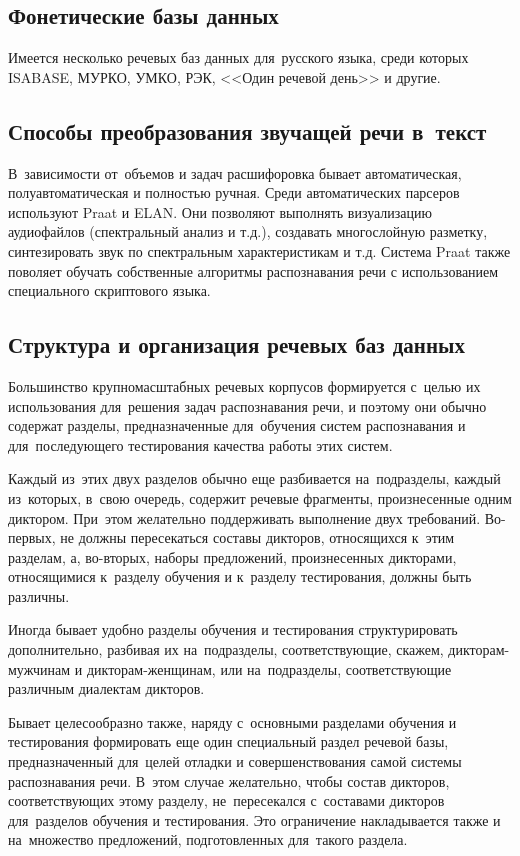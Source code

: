 \documentclass[12pt]{article}
\theoremstyle{definition}
\theoremstyle{remark}
\numberwithin{equation}{section}
\begin{document}
\subsection{Фонетические базы данных}
Имеется несколько речевых баз данных для~русского языка, среди которых
ISABASE, МУРКО, УМКО, РЭК, <<Один речевой день>> и другие.

\subsection{Способы преобразования звучащей речи в~текст}
В~зависимости от~объемов и задач расшифоровка бывает автоматическая,
полуавтоматическая и полностью ручная. Среди автоматических парсеров
используют Praat и ELAN. Они позволяют выполнять визуализацию аудиофайлов (спектральный анализ и т.д.), создавать многослойную разметку, синтезировать звук по спектральным характеристикам и т.д. Система Praat также поволяет обучать собственные алгоритмы распознавания речи с использованием специального скриптового языка.

\subsection{Структура и организация речевых баз данных}
Большинство крупномасштабных речевых корпусов формируется с~целью их
использования для~решения задач распознавания речи, и поэтому они обычно
содержат разделы, предназначенные для~обучения систем распознавания и
для~последующего тестирования качества работы этих систем.

Каждый из~этих двух разделов обычно еще разбивается на~подразделы, каждый
из~которых, в~свою очередь, содержит речевые фрагменты, произнесенные
одним диктором. При~этом желательно поддерживать выполнение двух требований.
Во-первых, не должны пересекаться составы дикторов, относящихся к~этим
разделам, а, во-вторых, наборы предложений, произнесенных дикторами,
относящимися к~разделу обучения и к~разделу тестирования, должны быть
различны.

Иногда бывает удобно разделы обучения и тестирования структурировать
дополнительно, разбивая их на~подразделы, соответствующие, скажем,
дикторам-мужчинам и дикторам-женщинам, или на~подразделы, соответствующие
различным диалектам дикторов.

Бывает целесообразно также, наряду с~основными разделами обучения и
тестирования формировать еще один специальный раздел речевой базы,
предназначенный для~целей отладки и совершенствования самой системы
распознавания речи. В~этом случае желательно, чтобы состав дикторов,
соответствующих этому разделу, не~пересекался с~составами дикторов
для~разделов обучения и тестирования. Это ограничение накладывается
также и на~множество предложений, подготовленных для~такого раздела.
\end{document}
